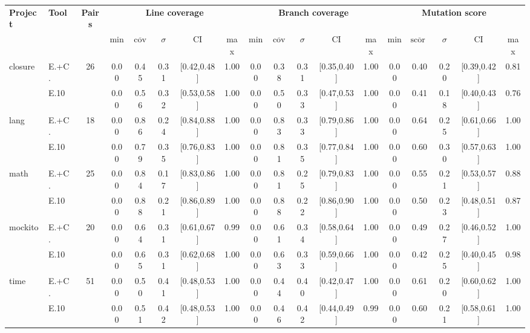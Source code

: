 \begin{tabular}{ l l c | ccccc | ccccc | ccccc }
\hline 
\textbf{Project} & \textbf{Tool} & \textbf{Pairs} & \multicolumn{5}{c}{\textbf{Line coverage}} & \multicolumn{5}{c}{\textbf{Branch coverage}} & \multicolumn{5}{c}{\textbf{Mutation score}} \\ 
  &   &   & min & $\overline{\text{cov}}$ & $\sigma$ & CI & max & min & $\overline{\text{cov}}$ & $\sigma$ & CI & max & min & $\overline{\text{score}}$ & $\sigma$ & CI & max \\ 
\hline 
closure & E.+C. & 26 & 0.00 & 0.45 & 0.31 & [0.42,0.48] & 1.00 & 0.00 & 0.38 & 0.31 & [0.35,0.40] & 1.00 & 0.00 & 0.40 & 0.20 & [0.39,0.42] & 0.81 \\ 
  & E.10 &   & 0.00 & 0.56 & 0.32 & [0.53,0.58] & 1.00 & 0.00 & 0.50 & 0.33 & [0.47,0.53] & 1.00 & 0.00 & 0.41 & 0.18 & [0.40,0.43] & 0.76 \\ 
lang & E.+C. & 18 & 0.00 & 0.86 & 0.24 & [0.84,0.88] & 1.00 & 0.00 & 0.83 & 0.33 & [0.79,0.86] & 1.00 & 0.00 & 0.64 & 0.25 & [0.61,0.66] & 1.00 \\ 
  & E.10 &   & 0.00 & 0.79 & 0.35 & [0.76,0.83] & 1.00 & 0.00 & 0.81 & 0.35 & [0.77,0.84] & 1.00 & 0.00 & 0.60 & 0.30 & [0.57,0.63] & 1.00 \\ 
math & E.+C. & 25 & 0.00 & 0.84 & 0.17 & [0.83,0.86] & 1.00 & 0.00 & 0.81 & 0.25 & [0.79,0.83] & 1.00 & 0.00 & 0.55 & 0.21 & [0.53,0.57] & 0.88 \\ 
  & E.10 &   & 0.00 & 0.88 & 0.21 & [0.86,0.89] & 1.00 & 0.00 & 0.88 & 0.22 & [0.86,0.90] & 1.00 & 0.00 & 0.50 & 0.23 & [0.48,0.51] & 0.87 \\ 
mockito & E.+C. & 20 & 0.00 & 0.64 & 0.31 & [0.61,0.67] & 0.99 & 0.00 & 0.61 & 0.34 & [0.58,0.64] & 1.00 & 0.00 & 0.49 & 0.27 & [0.46,0.52] & 1.00 \\ 
  & E.10 &   & 0.00 & 0.65 & 0.31 & [0.62,0.68] & 1.00 & 0.00 & 0.63 & 0.33 & [0.59,0.66] & 1.00 & 0.00 & 0.42 & 0.25 & [0.40,0.45] & 0.98 \\ 
time & E.+C. & 51 & 0.00 & 0.50 & 0.41 & [0.48,0.53] & 1.00 & 0.00 & 0.44 & 0.40 & [0.42,0.47] & 1.00 & 0.00 & 0.61 & 0.20 & [0.60,0.62] & 1.00 \\ 
  & E.10 &   & 0.00 & 0.51 & 0.42 & [0.48,0.53] & 1.00 & 0.00 & 0.46 & 0.42 & [0.44,0.49] & 0.99 & 0.00 & 0.60 & 0.21 & [0.58,0.61] & 1.00 \\ 
\hline 
\end{tabular}
